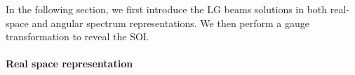 In the following section, we first introduce the LG beams solutions in both real-space and angular spectrum representations. We then perform a gauge transformation to reveal the SOI.

\paragraph{Real space representation} 

